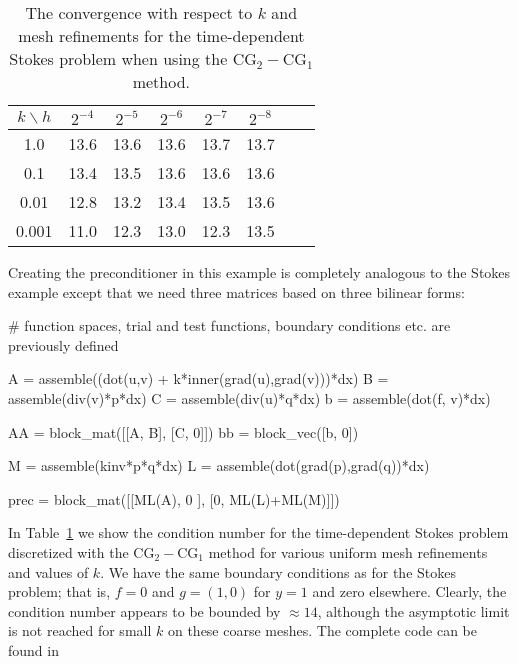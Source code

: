 \begin{table}
  \centering
  \begin{tabular}{cccccccc}
    \toprule
    $k\backslash h$ & $2^{-4}$ & $2^{-5}$ & $2^{-6}$ & $2^{-7}$ & $2^{-8}$ \\
    \midrule
    1.0 & 13.6 & 13.6 & 13.6 & 13.7 & 13.7 \\
    0.1 & 13.4 & 13.5 & 13.6 & 13.6 & 13.6 \\
    0.01 & 12.8 & 13.2 & 13.4 & 13.5 & 13.6 \\
    0.001 & 11.0 & 12.3 & 13.0 & 12.3  & 13.5 \\
    \bottomrule
  \end{tabular}
  \caption{The convergence with respect to $k$ and mesh refinements for the time-dependent Stokes problem
    when using the $\mathrm{CG}_2-\mathrm{CG}_1$ method.}\label{timestokes:ex}
\end{table}

Creating the preconditioner in this example is completely analogous to
the Stokes example except that we need three matrices based on three
bilinear forms:
\begin{python}

# function spaces, trial and test functions, boundary conditions etc. are previously defined

A = assemble((dot(u,v) + k*inner(grad(u),grad(v)))*dx)
B = assemble(div(v)*p*dx)
C = assemble(div(u)*q*dx)
b = assemble(dot(f, v)*dx)

AA = block_mat([[A, B],
                [C, 0]])
bb = block_vec([b, 0])

M = assemble(kinv*p*q*dx)
L = assemble(dot(grad(p),grad(q))*dx)

prec = block_mat([[ML(A),      0     ],
                  [0,     ML(L)+ML(M)]])
\end{python}
In Table~\ref{timestokes:ex} we show the condition number for the
time-dependent Stokes problem discretized with the
$\mathrm{CG}_2-\mathrm{CG}_1$ method for various uniform mesh refinements and
values of $k$. We have the same boundary conditions as for the Stokes
problem; that is, $f=0$ and $g = (1,0)$ for $y=1$ and zero elsewhere.
Clearly, the condition number appears to be bounded by $\approx 14$,
although the asymptotic limit is not reached for small $k$ on these
coarse meshes.  The complete code can be found in 

